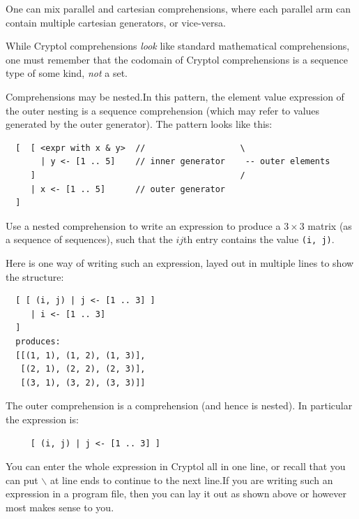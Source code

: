 \begin{tip}
  One can mix parallel and cartesian comprehensions, where each
  parallel arm can contain multiple cartesian
  generators, or vice-versa.\indComp\indCartesian\indParallel
\end{tip}

\begin{tip}
  While Cryptol comprehensions \emph{look} like standard mathematical
  comprehensions, one must remember that the codomain of Cryptol
  comprehensions is a sequence type of some kind, \emph{not} a set.
\end{tip}

Comprehensions may be nested.\indNestedComp In this pattern, the
element value expression of the outer nesting is a sequence
comprehension (which may refer to values generated by the outer
generator). The pattern looks like this:
\begin{minipage}{\textwidth}  %
\begin{Verbatim}
  [  [ <expr with x & y>  //                   \
       | y <- [1 .. 5]    // inner generator    -- outer elements
     ]                                         /
     | x <- [1 .. 5]      // outer generator
  ]
\end{Verbatim}
\end{minipage}

\begin{Exercise}\label{ex:seq:6}
  Use a nested comprehension to write an expression to produce a
  $3\times3$ matrix (as a sequence of sequences), such that the $ij$th
  entry contains the value {\tt (i, j)}.
\end{Exercise}
\begin{Answer}
  Here is one way of writing such an expression, layed out in multiple
  lines to show the structure:
\begin{Verbatim}
  [ [ (i, j) | j <- [1 .. 3] ]
     | i <- [1 .. 3]
  ]
  produces:
  [[(1, 1), (1, 2), (1, 3)], 
   [(2, 1), (2, 2), (2, 3)],
   [(3, 1), (3, 2), (3, 3)]]
\end{Verbatim}
The outer comprehension is a comprehension (and hence is nested). In
particular the expression is:
\begin{Verbatim}
     [ (i, j) | j <- [1 .. 3] ]
\end{Verbatim}
You can enter the whole expression in Cryptol all in one line, or
recall that you can put {\tt $\backslash$} at line ends to continue to
the next line.\indLineCont If you are writing such an expression in a
program file, then you can lay it out as shown above or however most
makes sense to you.
\end{Answer}

